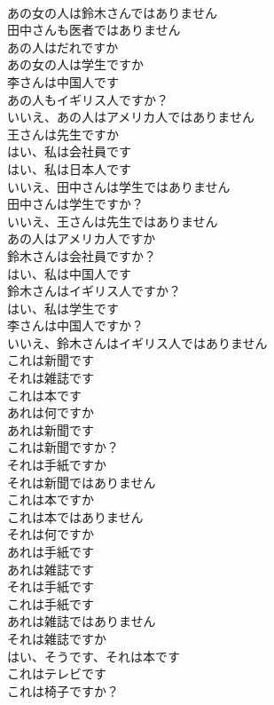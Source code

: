 \documentclass[8pt]{extreport}
\begin{document}
\begin{CJK}{UTF8}{min}
\\	あの女の人は鈴木さんではありません	
\\	田中さんも医者ではありません	
\\	あの人はだれですか	
\\	あの女の人は学生ですか	
\\	李さんは中国人です	
\\	あの人もイギリス人ですか？	
\\	いいえ、あの人はアメリカ人ではありません	
\\	王さんは先生ですか	
\\	はい、私は会社員です	
\\	はい、私は日本人です	
\\	いいえ、田中さんは学生ではありません	
\\	田中さんは学生ですか？	
\\	いいえ、王さんは先生ではありません	
\\	あの人はアメリカ人ですか	
\\	鈴木さんは会社員ですか？	
\\	はい、私は中国人です	
\\	鈴木さんはイギリス人ですか？	
\\	はい、私は学生です	
\\	李さんは中国人ですか？	
\\	いいえ、鈴木さんはイギリス人ではありません	
\\	これは新聞です	
\\	それは雑誌です	
\\	これは本です	
\\	あれは何ですか	
\\	あれは新聞です	
\\	これは新聞ですか？	
\\	それは手紙ですか	
\\	それは新聞ではありません	
\\	これは本ですか	
\\	これは本ではありません	
\\	それは何ですか	
\\	あれは手紙です	
\\	あれは雑誌です	
\\	それは手紙です	
\\	これは手紙です	
\\	あれは雑誌ではありません	
\\	それは雑誌ですか	
\\	はい、そうです、それは本です	
\\	これはテレビです	
\\	これは椅子ですか？	

\end{CJK}
\end{document}
